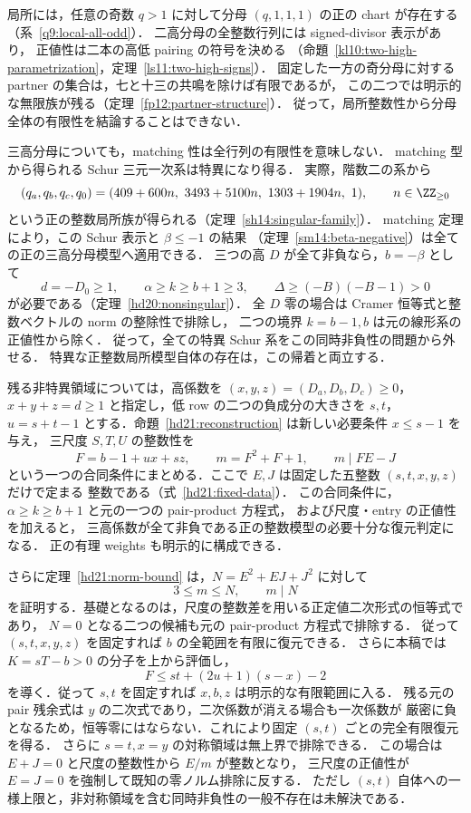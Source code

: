 局所には，任意の奇数 $q>1$ に対して分母 $(q,1,1,1)$ の正の chart が存在する
（系~\ref{q9:local-all-odd}）．
二高分母の全整数行列には signed-divisor 表示があり，
正値性は二本の高低 pairing の符号を決める
（命題~\ref{kl10:two-high-parametrization}，定理~\ref{ls11:two-high-signs}）．
固定した一方の奇分母に対する partner の集合は，七と十三の共鳴を除けば有限であるが，
この二つでは明示的な無限族が残る（定理~\ref{fp12:partner-structure}）．
従って，局所整数性から分母全体の有限性を結論することはできない．

三高分母についても，matching 性は全行列の有限性を意味しない．
matching 型から得られる Schur 三元一次系は特異になり得る．
実際，階数二の系から
\[
 (q_a,q_b,q_c,q_0)
 =(409+600n,\ 3493+5100n,\ 1303+1904n,\ 1),
 \qquad n\in\ZZ_{\ge0}
\]
という正の整数局所族が得られる（定理~\ref{sh14:singular-family}）．
matching 定理により，この Schur 表示と $\beta\le-1$ の結果
（定理~\ref{sm14:beta-negative}）は全ての正の三高分母模型へ適用できる．
三つの高 $D$ が全て非負なら，$b=-\beta$ として
\[
 d=-D_0\ge1,\qquad \alpha\ge k\ge b+1\ge3,
 \qquad \Delta\ge(-B)(-B-1)>0
\]
が必要である（定理~\ref{hd20:nonsingular}）．
全 $D$ 零の場合は Cramer 恒等式と整数ベクトルの norm の整除性で排除し，
二つの境界 $k=b-1,b$ は元の線形系の正値性から除く．
従って，全ての特異 Schur 系をこの同時非負性の問題から外せる．
特異な正整数局所模型自体の存在は，この帰着と両立する．

残る非特異領域については，高係数を
$(x,y,z)=(D_a,D_b,D_c)\ge0$，$x+y+z=d\ge1$ と指定し，低 row の二つの負成分の大きさを $s,t$，
$u=s+t-1$ とする．命題~\ref{hd21:reconstruction} は新しい必要条件 $x\le s-1$ を与え，
三尺度 $S,T,U$ の整数性を
\[
 F=b-1+ux+sz,\qquad m=F^2+F+1,\qquad m\mid FE-J
\]
という一つの合同条件にまとめる．ここで $E,J$ は固定した五整数 $(s,t,x,y,z)$ だけで定まる
整数である（式~\eqref{hd21:fixed-data}）．
この合同条件に，$\alpha\ge k\ge b+1$ と元の一つの pair-product 方程式，
および尺度・entry の正値性を加えると，
三高係数が全て非負である正の整数模型の必要十分な復元判定になる．
正の有理 weights も明示的に構成できる．

さらに定理~\ref{hd21:norm-bound} は，$N=E^2+EJ+J^2$ に対して
\[
 3\le m\le N,\qquad m\mid N
\]
を証明する．基礎となるのは，尺度の整数差を用いる正定値二次形式の恒等式であり，
$N=0$ となる二つの候補も元の pair-product 方程式で排除する．
従って $(s,t,x,y,z)$ を固定すれば $b$ の全範囲を有限に復元できる．
さらに本稿では $K=sT-b>0$ の分子を上から評価し，
\[
 F\le st+(2u+1)(s-x)-2
\]
を導く．従って $s,t$ を固定すれば $x,b,z$ は明示的な有限範囲に入る．
残る元の pair 残余式は $y$ の二次式であり，二次係数が消える場合も一次係数が
厳密に負となるため，恒等零にはならない．これにより固定 $(s,t)$ ごとの完全有限復元を得る．
さらに $s=t,x=y$ の対称領域は無上界で排除できる．
この場合は $E+J=0$ と尺度の整数性から $E/m$ が整数となり，
三尺度の正値性が $E=J=0$ を強制して既知の零ノルム排除に反する．
ただし $(s,t)$ 自体への一様上限と，非対称領域を含む同時非負性の一般不存在は未解決である．

